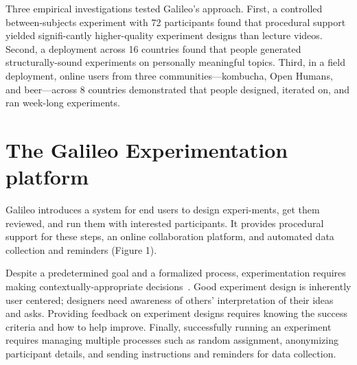 Three empirical investigations tested Galileo’s approach. First, a controlled between-subjects experiment with 72 participants found that procedural support yielded signifi-cantly higher-quality experiment designs than lecture videos. Second, a deployment across 16 countries found that people generated structurally-sound experiments on personally meaningful topics. Third, in a field deployment, online users from three communities—kombucha, Open Humans, and beer—across 8 countries demonstrated that people designed, iterated on, and ran week-long experiments.

\section{The Galileo Experimentation platform}
Galileo introduces a system for end users to design experi-ments, get them reviewed, and run them with interested participants. It provides procedural support for these steps, an online collaboration platform, and automated data collection and reminders (Figure 1).

Despite a predetermined goal and a formalized process, experimentation requires making contextually-appropriate decisions~\cite{Martin2007}. Good experiment design is inherently user centered; designers need awareness of others’ interpretation of their ideas and asks. Providing feedback on experiment designs requires knowing the success criteria and how to help improve. Finally, successfully running an experiment requires managing multiple processes such as random assignment, anonymizing participant details, and sending instructions and reminders for data collection.

